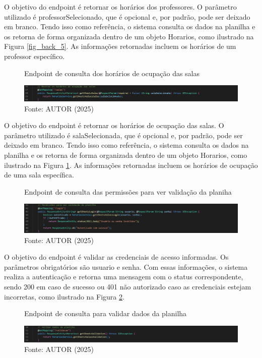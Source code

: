 \begin{itemize}
    O objetivo do endpoint é retornar os horários dos professores. O parâmetro utilizado é professorSelecionado, que é opcional e, por padrão, pode ser deixado em branco. Tendo isso como referência, o sistema consulta os dados na planilha e os retorna de forma organizada dentro de um objeto Horarios, como ilustrado na Figura \ref{fig_back_5}. As informações retornadas incluem os horários de um professor específico.

    \begin{figure}[htb]
        \centering
        \caption{Endpoint de consulta dos horários de ocupação das salas}
        \includegraphics[width=1\textwidth]{Figuras/back-6.png}
        \caption*{Fonte: AUTOR (2025)}
        \label{fig_back_6}
    \end{figure}

    O objetivo do endpoint é retornar os horários de ocupação das salas. O parâmetro utilizado é salaSelecionada, que é opcional e, por padrão, pode ser deixado em branco. Tendo isso como referência, o sistema consulta os dados na planilha e os retorna de forma organizada dentro de um objeto Horarios, como ilustrado na Figura \ref{fig_back_6}. As informações retornadas incluem os horários de ocupação de uma sala específica.

    \begin{figure}[htb]
        \centering
        \caption{Endpoint de consulta das permissões para ver validação da planiha}
        \includegraphics[width=1\textwidth]{Figuras/back-7.png}
        \caption*{Fonte: AUTOR (2025)}
        \label{fig_back_7}
    \end{figure}

    O objetivo do endpoint é validar as credenciais de acesso informadas. Os parâmetros obrigatórios são usuario e senha. Com essas informações, o sistema realiza a autenticação e retorna uma mensagem com o status correspondente, sendo 200 em caso de sucesso ou 401 não autorizado caso as credenciais estejam incorretas, como ilustrado na Figura \ref{fig_back_7}.

    \begin{figure}[H]
        \centering
        \caption{Endpoint de consulta para validar dados da planilha}
        \includegraphics[width=1\textwidth]{Figuras/back-8.png}
        \caption*{Fonte: AUTOR (2025)}
        \label{fig_back_8}
    \end{figure}


\end{itemize}
